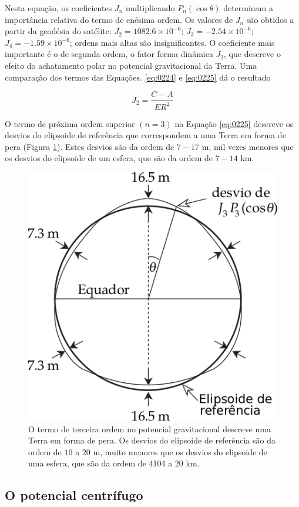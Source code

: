 \documentclass[]{book}
\theoremstyle{definition}
\theoremstyle{definition}
\theoremstyle{definition}
\theoremstyle{remark}
\begin{document}
Nesta equação, os coeficientes \(J_n\) multiplicando \(P_n(\cos\theta)\) determinam a importância relativa do termo de enésima ordem. Os valores de \(J_n\) são obtidos a partir da geodésia do satélite: \(J_2= 1082.6\times 10^{-6}\); \(J_3= -2.54\times 10^{-6}\); \(J_4=-1.59\times 10^{-6}\); ordens mais altas são insignificantes. O coeficiente mais importante é o de segunda ordem, o fator forma dinâmica \(J_2\), que descreve o efeito do achatamento polar no potencial gravitacional da Terra. Uma comparação dos termos das Equações. \eqref{eq:0224} e \eqref{eq:0225} dá o resultado

\begin{equation}
J_{2}=\frac{C-A}{E R^{2}} \label{eq:0226}
\end{equation}

O termo de próxima ordem superior \((n=3)\) na Equação \eqref{eq:0225} descreve os desvios do elipsoide de referência que correspondem a uma Terra em forma de pera (Figura \ref{fig:elipsoide3}). Estes desvios são da ordem de \(7-17\) m, mil vezes menores que os desvios do elipsoide de um esfera, que são da ordem de \(7-14\) km.

\begin{figure}

{\centering \includegraphics[width=0.4\linewidth]{fig/Fig_02.22} 

}

\caption{O termo de terceira ordem no potencial gravitacional descreve uma Terra em forma de pera. Os desvios do elipsoide de referência são da ordem de $10$ a $20$ m, muito menores que os desvios do elipsoide de uma esfera, que são da ordem de 4104 a $20$ km.}\label{fig:elipsoide3}
\end{figure}

\hypertarget{o-potencial-centrifugo}{%
\subsection{O potencial centrífugo}\label{o-potencial-centrifugo}}
\end{document}
